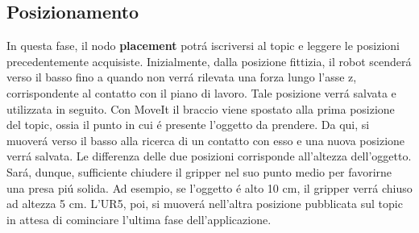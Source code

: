 \subsection{Posizionamento} \label{sub:placement}
In questa fase, il nodo \textbf{placement}\footnotemark{} potr\'{a} iscriversi al topic e leggere le posizioni precedentemente 
acquisiste. Inizialmente, dalla posizione fittizia, il robot scender\'{a} verso il basso fino a quando non verr\'{a} rilevata 
una forza lungo l'asse z, corrispondente al contatto con il piano di lavoro. Tale posizione verr\'{a} salvata e utilizzata in seguito. 
Con MoveIt il braccio viene spostato alla prima posizione del topic, ossia il punto in cui \'{e} presente l'oggetto da prendere.
Da qui, si muover\'{a} verso il basso alla ricerca di un contatto con esso e una nuova posizione verr\'{a} salvata. 
Le differenza delle due posizioni corrisponde all'altezza dell'oggetto. Sar\'{a}, dunque, sufficiente chiudere il gripper 
nel suo punto medio per favorirne una presa pi\'{u} solida. Ad esempio, se l'oggetto \'{e} alto 10 cm, il gripper verr\'{a} chiuso 
ad altezza 5 cm. 
L'UR5, poi, si muover\'{a} nell'altra posizione pubblicata sul topic in attesa di cominciare l'ultima fase dell'applicazione.
